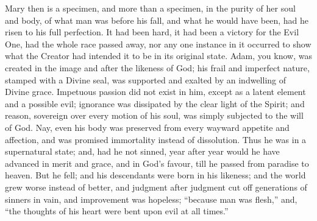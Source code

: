 Mary then is a specimen, and more than a specimen, in the purity of
her soul and body, of what man was before his fall, and what he would
have been, had he risen to his full perfection. It had been hard, it
had been a victory for the Evil One, had the whole race passed away,
nor any one instance in it occurred to show what the Creator had
intended it to be in its original state. Adam, you know, was created
in the image and after the likeness of God; his frail and imperfect
nature, stamped with a Divine seal, was supported and exalted by an
indwelling of Divine grace. Impetuous passion did not exist in him,
except as a latent element and a possible evil; ignorance was
dissipated by the clear light of the Spirit; and reason, sovereign
over every motion of his soul, was simply subjected to the will of
God. Nay, even his body was preserved from every wayward appetite and
affection, and was promised immortality instead of dissolution. Thus
he was in a supernatural state; and, had he not sinned, year after
year would he have advanced in merit and grace, and in God's favour,
till he passed from paradise to heaven. But he fell; and his
descendants were born in his likeness; and the world grew worse
instead of better, and judgment after judgment cut off generations of
sinners in vain, and improvement was hopeless; ``because man was
flesh,'' and, ``the thoughts of his heart were bent upon evil
at all times.''

